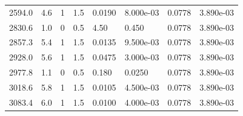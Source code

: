 \documentclass[preview]{standalone}
\begin{document}
{{\begin{tabular}{L{1.2cm}C{1.2cm} C{0.3cm}C{0.5cm} C{1.4cm}C{1.4cm} C{1.4cm}C{1.4cm}}
  2594.0  &   4.6  & 1     & 1.5 &  0.0190  & 8.000e-03  & 0.0778 &  3.890e-03   \\ 
  2830.6  &   1.0  & 0     & 0.5 &  4.50  & 0.450  & 0.0778 &  3.890e-03   \\ 
  2857.3  &   5.4  & 1     & 1.5 &  0.0135  & 9.500e-03  & 0.0778 &  3.890e-03   \\ 
  2928.0  &   5.6  & 1     & 1.5 &  0.0475  & 3.000e-03  & 0.0778 &  3.890e-03   \\ 
  2977.8  &   1.1  & 0     & 0.5 &  0.180  & 0.0250  & 0.0778 &  3.890e-03   \\ 
  3018.6  &   5.8  & 1     & 1.5 &  0.0105  & 4.500e-03  & 0.0778 &  3.890e-03   \\ 
  3083.4  &   6.0  & 1     & 1.5 &  0.0100  & 4.000e-03  & 0.0778 &  3.890e-03   \\ 
\hline 
\end{tabular} 

}}
\end{document}
